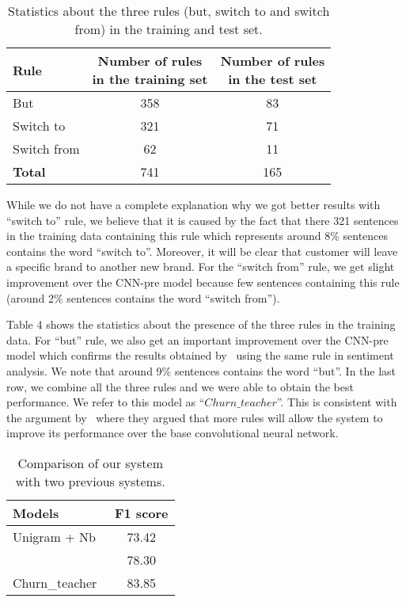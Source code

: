\documentclass[11pt,letterpaper]{article}
\begin{document}
\begin{table}
\small
\centering
\begin{tabular}{|l|c|c|}
\hline \bf Rule & \bf  \makecell {Number of rules \\ in the training set} &  \bf \makecell {Number of rules \\ in the test set} \\ \hline
 	
But & 358 & 83 \\
Switch to & 321 & 71 \\
Switch from & 62 & 11 \\ \hline
\bf Total & 741 & 165 \\ 


\hline
\end{tabular}
\caption{Statistics about the three rules (but, switch to and switch from) in the training and test set.}
\end{table}

While we do not have a complete explanation why we got better results with \enquote{switch to} rule, we believe that it is caused by the fact that there 321 sentences in the training data containing this rule which represents around 8\% sentences contains the word \enquote{switch to}. Moreover, it will be clear that customer will leave a specific brand to another new brand. For the \enquote{switch from} rule, we get slight improvement over the CNN-pre model because few sentences containing this rule (around 2\% sentences contains the word \enquote{switch from}). 

Table 4 shows the statistics about the presence of the three rules in the training data. For \enquote{but} rule, we also get an important improvement over the CNN-pre model which confirms the results obtained by~\cite{hu} using the same rule in sentiment analysis. We note that around 9\% sentences contains the word \enquote{but}. In the last row, we combine all the three rules and we were able to obtain the best performance. We refer to this model as \enquote{\(Churn\_teacher\)}. This is consistent with the argument by~\cite{hu} where they argued that more rules will allow the system to improve its performance over the base convolutional neural network.

\begin{table}
\small
\centering
\begin{tabular}{|l|c|}
\hline \bf Models & \bf F1 score \\ \hline

Unigram + Nb~\cite{amiri2015} & 73.42 \\
~\cite{amiri2016}  &  78.30 \\
Churn\_teacher & 83.85 \\

\hline
\end{tabular}
\caption{Comparison of our system with two previous systems.}
\end{table}
\end{document}
